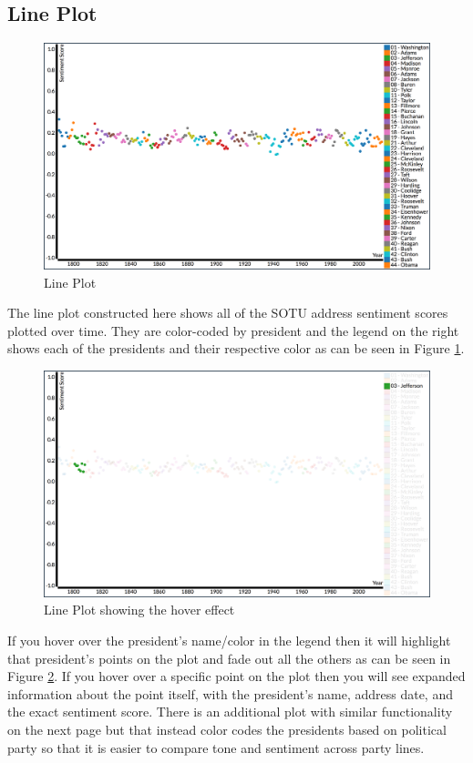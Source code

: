 \documentclass[acmtog, review, screen]{acmart}
\begin{document}
\subsection{Line Plot}
\begin{figure}
  \includegraphics[width=\columnwidth]{Lineplot.png}
  \caption{Line Plot}
  \label{fig:lineplot1}
\end{figure}
The line plot constructed here shows all of the SOTU address sentiment scores plotted over time.
They are color-coded by president and the legend on the right shows each of the presidents and their respective color as can be seen in Figure \ref{fig:lineplot1}.
\begin{figure}
  \includegraphics[width=\columnwidth]{Lineplothover.png}
  \caption{Line Plot showing the hover effect}
  \label{fig:lineplot2}
\end{figure}
If you hover over the president's name/color in the legend then it will highlight that president's points on the plot and fade out all the others as can be seen in Figure \ref{fig:lineplot2}.
If you hover over a specific point on the plot then you will see expanded information about the point itself, with the president's name, address date, and the exact sentiment score.
There is an additional plot with similar functionality on the next page but that instead color codes the presidents based on political party so that it is easier to compare tone and sentiment across party lines.
\end{document}
